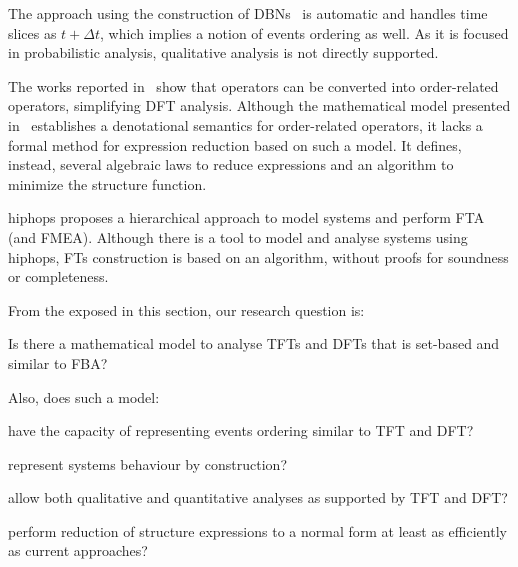 \documentclass[12pt,openright,twoside,a4paper,oldfontcommands,english,brazil,final]{abntex2}
\theoremstyle{theo}
\begin{document}
The approach using the construction of \acp{DBN}~\cite{BRM+2005} is automatic and handles time slices as $t + \Delta t$, which implies a notion of events ordering as well.
As it is focused in probabilistic analysis, qualitative analysis is not directly supported.

The works reported in~\cite{Merle2010,XTD2012} show that  operators can be converted into order-related operators, simplifying \ac{DFT} analysis.
Although the mathematical model presented in~\cite{Merle2010} establishes a denotational semantics for order-related operators, it lacks a formal method for expression reduction based on such a model.
It defines, instead, several algebraic laws to reduce expressions and an algorithm to minimize the structure function.

\begin{sloppypar}
\Ac{hiphops} proposes a hierarchical approach to model systems and perform \ac{FTA} (and \ac{FMEA}).
Although there is a tool to model and analyse systems using \ac{hiphops}, \acp{FT} construction is based on an algorithm, without proofs for soundness or completeness.
\end{sloppypar}


From the exposed in this section, our research question is:
\begin{rqenum}[series=researchquestion]
  \item Is there a mathematical model to analyse \acp{TFT} and \acp{DFT} that is set-based and similar to \ac{FBA}?\label{question:mathematical-model}
\end{rqenum}
%
Also, does such a model:
%
\begin{rqenum}[resume*=researchquestion]
  \item have the capacity of representing events ordering similar to \ac{TFT} and \ac{DFT}\label{question:ordering-representation}?
  \item represent systems behaviour by construction\label{question:gap}?
  \item allow both qualitative and quantitative analyses as supported by \ac{TFT} and \ac{DFT}\label{question:analyses}?
  \item perform reduction of structure expressions to a normal form at least as efficiently as current approaches\label{question:efficiency}?
\end{rqenum}
\end{document}
